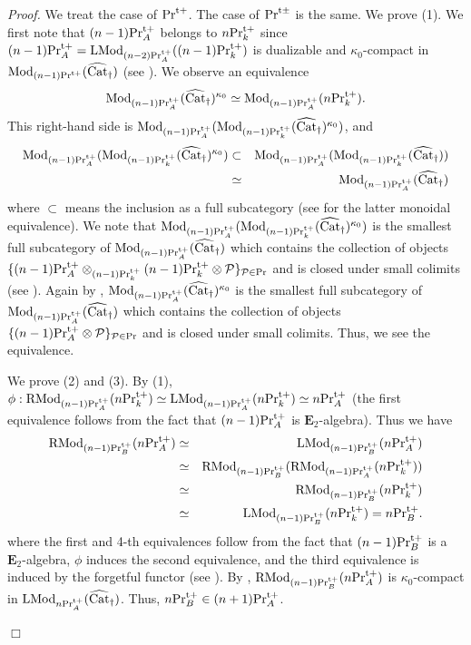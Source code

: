 \documentclass[leqno,12pt]{amsart}
\theoremstyle{plain}
\theoremstyle{definition}
\newcommand{\PR}{\textup{Pr}}
\newcommand{\PRTT}{\textup{Pr}^{\textup{t}+}}
\newcommand{\PRTTT}{\textup{Pr}^{\textup{t}\pm}}
\newcommand{\PPP}{\mathcal{P}}
\newcommand{\Mod}{\operatorname{Mod}}
\newcommand{\vCat}{\widehat{\operatorname{Cat}}_\dagger}
\newcommand{\etwo}{\mathbf{E}_2}
\newcommand{\LMod}{\operatorname{LMod}}
\newcommand{\RMod}{\operatorname{RMod}}
\newcommand{\Proof}{{\sl Proof.}\quad}
\newcommand{\QED}{{\unskip\nobreak\hfil\penalty50\quad\null\nobreak\hfil
{$\Box$}\parfillskip0pt\finalhyphendemerits0\par\medskip}}
\begin{document}
\Proof
We treat the case of $\PRTT$. The case of $\PRTTT$ is the same.
We prove (1). We first note that $(n-1)\PRTT_A$ belongs to $n\PRTT_k$
since 
$(n-1)\PRTT_A=\LMod_{(n-2)\PRTT_A}((n-1)\PRTT_k)$ is dualizable and $\kappa_0$-compact in $\Mod_{(n-1)\PRTT}(\vCat)$ (see \cite[Proposition 5.1.10]{Ste}).
We observe an equivalence 
\[
\Mod_{(n-1)\PRTT_A}(\vCat)^{\kappa_0}\simeq \Mod_{(n-1)\PRTT_A}(n\PRTT_k). %
\]
This right-hand side is $\Mod_{(n-1)\PRTT_A}(\Mod_{(n-1)\PRTT_k}(\vCat)^{\kappa_0})$, and
\begin{eqnarray*}
\Mod_{(n-1)\PRTT_A}(\Mod_{(n-1)\PRTT_k}(\vCat)^{\kappa_0}) &\subset& \Mod_{(n-1)\PRTT_A}(\Mod_{(n-1)\PRTT_k}(\vCat))  \\
&\simeq& \Mod_{(n-1)\PRTT_A}(\vCat) 
\end{eqnarray*}
where $\subset$ means the inclusion as a full subcategory (see \cite[7.1.3.1, 7.1.3.3]{HA} for the latter monoidal equivalence).
We note that
$\Mod_{(n-1)\PRTT_A}(\Mod_{(n-1)\PRTT_k}(\vCat)^{\kappa_0})$ is the smallest full subcategory of
$\Mod_{(n-1)\PRTT_A}(\vCat)$ which contains the collection of objects
$\{(n-1)\PRTT_A\otimes_{(n-1)\PRTT_k}(n-1)\PRTT_k\otimes \PPP\}_{\PPP\in \PR}$
and is closed under small colimits (see \cite[Proposition 5.1.7]{Ste}).
Again by \cite[Proposition 5.1.7]{Ste},
$\Mod_{(n-1)\PRTT_A}(\vCat)^{\kappa_0}$ is the smallest full subcategory of
$\Mod_{(n-1)\PRTT_A}(\vCat)$ which contains the collection of objects
$\{(n-1)\PRTT_A\otimes \PPP\}_{\PPP\in \PR}$
and is closed under small colimits. Thus, we see the equivalence.

We prove (2) and (3). By (1),
$\phi:\RMod_{(n-1)\PRTT_A}(n\PRTT_k)\simeq \LMod_{(n-1)\PRTT_A}(n\PRTT_k)\simeq n\PRTT_A$
(the first equivalence follows from the fact that $(n-1)\PRTT_A$ is $\etwo$-algebra).
Thus we have
\begin{eqnarray*}
\RMod_{(n-1)\PRTT_B}(n\PRTT_A) &\simeq& \LMod_{(n-1)\PRTT_B}(n\PRTT_A) \\
&\simeq& \RMod_{(n-1)\PRTT_B}(\RMod_{(n-1)\PRTT_A}(n\PRTT_k)) \\
&\simeq& \RMod_{(n-1)\PRTT_B}(n\PRTT_k)  \\
&\simeq& \LMod_{(n-1)\PRTT_B}(n\PRTT_k)= n\PRTT_B.
\end{eqnarray*}
where the first and 4-th equivalences follow from the fact that $(n-1)\PRTT_B$ is a $\etwo$-algebra,
$\phi$ induces the second equivalence, and the third equivalence is induced by the forgetful functor
(see \cite[7.1.3.1]{HA}).
By \cite[Proposition 5.1.10]{Ste}, $\RMod_{(n-1)\PRTT_B}(n\PRTT_A)$ is $\kappa_0$-compact in $\LMod_{n\PRTT_A}(\vCat)$.
Thus, $n\PRTT_B\in (n+1)\PRTT_A$.
\QED
\end{document}
